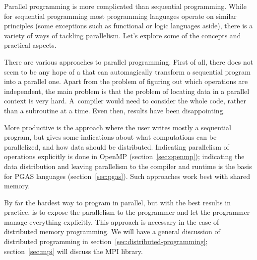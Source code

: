 
\label{sec:parallel-programming}

Parallel programming is more complicated than sequential
programming. While for sequential programming most programming
languages operate on similar principles (some exceptions such as
functional or logic languages aside), there is a variety of ways of
tackling parallelism. Let's explore some of the concepts and practical
aspects.

There are various approaches to parallel programming. First of all,
there does not seem to be any hope of a
that can
automagically transform a sequential program into a parallel
one. Apart from the problem of figuring out which operations are
independent, the main
problem is that the problem of locating data in a parallel context is
very hard. A~compiler would need to consider the whole code, rather
than a subroutine at a time. Even then, results have been
disappointing.

More productive is the approach where the user writes mostly a
sequential program, but gives some indications about what computations
can be parallelized, and how data should be distributed. Indicating
parallelism of operations explicitly is done in OpenMP
(section~\ref{sec:openmp}); indicating the data distribution and
leaving parallelism to the compiler and runtime is the basis for PGAS
languages (section~\ref{sec:pgas}). Such approaches work best with
shared memory.

By far the hardest way to program in parallel, but with the best
results in practice, is to expose the parallelism to the programmer
and let the programmer manage everything explicitly. This approach is
necessary in the case of distributed memory programming. We will have
a general discussion of distributed programming in
section~\ref{sec:distributed-programming}; section~\ref{sec:mpi} will
discuss the MPI library.

